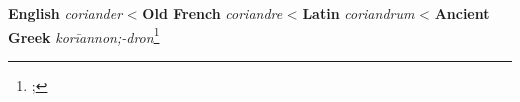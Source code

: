 \begin{etymology}\label{ety:coriander}
\textbf{English} \textit{coriander}
< \textbf{Old French} \textit{coriandre}
< \textbf{Latin} \textit{coriandrum}
< \textbf{Ancient Greek} \textit{korīannon;-dron}\footnote{; }
\end{etymology}